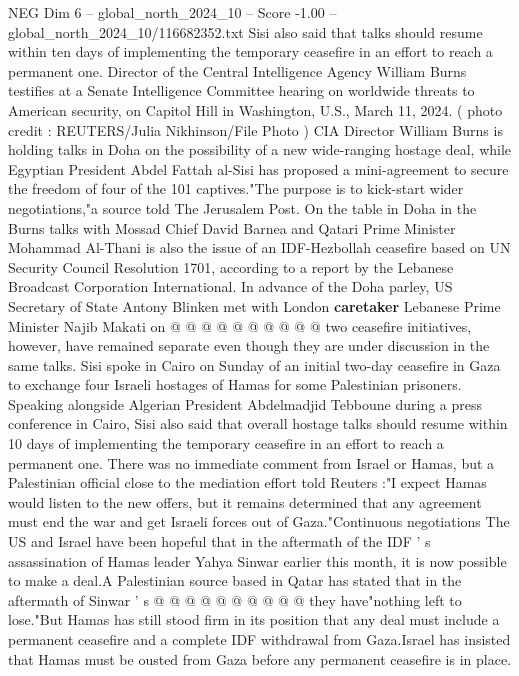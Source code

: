\begin{textsample}{NEG Dim 6 – global\_north\_2024\_10 – Score -1.00 – global\_north\_2024\_10/116682352.txt}  \label{ex:f6_neg_079}
Sisi also said that talks should resume within ten days of implementing the temporary ceasefire in an effort to reach a permanent one.
Director of the Central Intelligence Agency William Burns testifies at a Senate Intelligence Committee hearing on worldwide threats to American security, on Capitol Hill in Washington, U.S., March 11, 2024. ( photo credit : REUTERS/Julia Nikhinson/File Photo ) CIA Director William Burns is holding talks in Doha on the possibility of a new wide-ranging hostage deal, while Egyptian President Abdel Fattah al-Sisi has proposed a mini-agreement to secure the freedom of four of the 101 captives."The purpose is to kick-start wider negotiations,"a source told The Jerusalem Post.
On the table in Doha in the Burns talks with Mossad Chief David Barnea and Qatari Prime Minister Mohammad Al-Thani is also the issue of an IDF-Hezbollah ceasefire based on UN Security Council Resolution 1701, according to a report by the Lebanese Broadcast Corporation International.
In advance of the Doha parley, US Secretary of State Antony Blinken met with London \textbf{caretaker} Lebanese Prime Minister Najib Makati on @ @ @ @ @ @ @ @ @ @ two ceasefire initiatives, however, have remained separate even though they are under discussion in the same talks.
Sisi spoke in Cairo on Sunday of an initial two-day ceasefire in Gaza to exchange four Israeli hostages of Hamas for some Palestinian prisoners.
Speaking alongside Algerian President Abdelmadjid Tebboune during a press conference in Cairo, Sisi also said that overall hostage talks should resume within 10 days of implementing the temporary ceasefire in an effort to reach a permanent one.
There was no immediate comment from Israel or Hamas, but a Palestinian official close to the mediation effort told Reuters :"I expect Hamas would listen to the new offers, but it remains determined that any agreement must end the war and get Israeli forces out of Gaza."Continuous negotiations The US and Israel have been hopeful that in the aftermath of the IDF ' s assassination of Hamas leader Yahya Sinwar earlier this month, it is now possible to make a deal.A Palestinian source based in Qatar has stated that in the aftermath of Sinwar ' s @ @ @ @ @ @ @ @ @ @ they have"nothing left to lose."But Hamas has still stood firm in its position that any deal must include a permanent ceasefire and a complete IDF withdrawal from Gaza.Israel has insisted that Hamas must be ousted from Gaza before any permanent ceasefire is in place.

\end{textsample}
